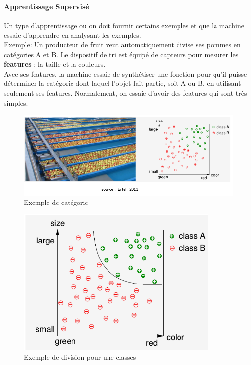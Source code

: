 \documentclass[oneside]{book}
\begin{document}
\paragraph{Apprentissage Supervisé}
Un type d'apprentissage ou on doit fournir certains exemples et que la machine essaie d'apprendre en analysant les exemples.\\

Exemple: Un producteur de fruit veut automatiquement divise ses pommes en catégories A et B. Le dispositif de tri est équipé de capteurs pour mesurer les \textbf{features} : la taille et la couleurs.\\

Avec ses features, la machine essaie de synthétiser une fonction pour qu'il puisse déterminer la catégorie dont laquel l'objet fait partie, soit A ou B, en utilisant seulement ses features. Normalement, on essaie d'avoir des features qui sont très simples.\\

\begin{figure}[!ht]
\centering
\includegraphics[width= \linewidth]{Classes_ML.png}
\caption{Exemple de catégorie}
\label{fig:Classes_in_ML}
\end{figure}

\begin{figure}[!ht]
\centering
\includegraphics[width = \linewidth]{Classes_division.png}
\caption{Exemple de division pour une classes}
\label{fig:Classes_division}
\end{figure}
\end{document}
